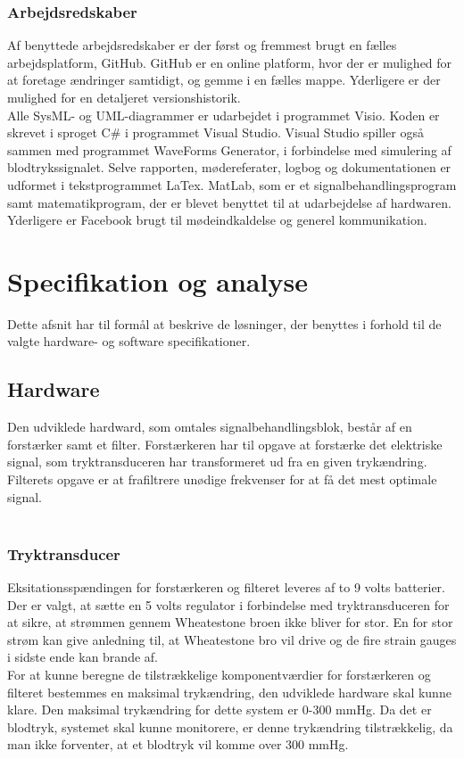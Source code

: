\subsubsection{Arbejdsredskaber} 
Af benyttede arbejdsredskaber er der først og fremmest brugt en fælles arbejdsplatform, GitHub. GitHub er en online platform, hvor der er mulighed for at foretage ændringer samtidigt, og gemme i en fælles mappe. Yderligere er der mulighed for en detaljeret versionshistorik.\\
Alle SysML- og UML-diagrammer er udarbejdet i programmet Visio. Koden er skrevet i sproget C\# i programmet Visual Studio. Visual Studio spiller også sammen med programmet WaveForms Generator, i forbindelse med simulering af blodtrykssignalet. Selve rapporten, mødereferater, logbog og dokumentationen er udformet i tekstprogrammet LaTex. MatLab, som er et signalbehandlingsprogram samt matematikprogram, der er blevet benyttet til at udarbejdelse af hardwaren. Yderligere er Facebook brugt til mødeindkaldelse og generel kommunikation.



\section{Specifikation og analyse}
Dette afsnit har til formål at beskrive de løsninger, der benyttes i forhold til de valgte hardware- og software specifikationer. 

\subsection{Hardware}
Den udviklede hardward, som omtales signalbehandlingsblok, består af en forstærker samt et filter. Forstærkeren har til opgave at forstærke det elektriske signal, som tryktransduceren har transformeret ud fra en given trykændring. Filterets opgave er at frafiltrere unødige frekvenser for at få det mest optimale signal.
\\\\
\subsubsection{Tryktransducer}
Eksitationsspændingen for forstærkeren og filteret leveres af to 9 volts batterier. Der er valgt, at sætte en 5 volts regulator i forbindelse med tryktransduceren for at sikre, at strømmen gennem Wheatestone broen ikke bliver for stor. En for stor strøm kan give anledning til, at Wheatestone bro vil drive og de fire strain gauges i sidste ende kan brande af.\\
For at kunne beregne de tilstrækkelige komponentværdier for forstærkeren og filteret bestemmes en maksimal trykændring, den udviklede hardware skal kunne klare. Den maksimal trykændring for dette system er 0-300 mmHg. Da det er blodtryk, systemet skal kunne monitorere, er denne trykændring tilstrækkelig, da man ikke forventer, at et blodtryk vil komme over 300 mmHg.

